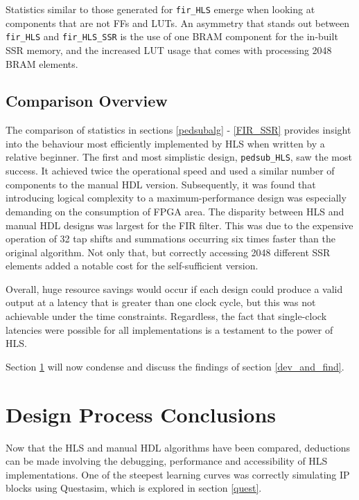 \documentclass[10pt]{article}
\begin{document}
Statistics similar to those generated for \texttt{fir\_HLS} emerge when looking at components that are not FFs and LUTs. An asymmetry that stands out between \texttt{fir\_HLS} and \texttt{fir\_HLS\_SSR} is the use of one BRAM component for the in-built SSR memory, and the increased LUT usage that comes with processing 2048 BRAM elements.

\subsection{Comparison Overview} \label{comp_overview}

The comparison of statistics in sections \ref{pedsubalg} - \ref{FIR_SSR} provides insight into the behaviour most efficiently implemented by HLS when written by a relative beginner. The first and most simplistic design, \texttt{pedsub\_HLS}, saw the most success. It achieved twice the operational speed and used a similar number of components to the manual HDL version. Subsequently, it was found that introducing logical complexity to a maximum-performance design was especially demanding on the consumption of FPGA area. The disparity between HLS and manual HDL designs was largest for the FIR filter. This was due to the expensive operation of 32 tap shifts and summations occurring six times faster than the original algorithm. Not only that, but correctly accessing 2048 different SSR elements added a notable cost for the self-sufficient version.

Overall, huge resource savings would occur if each design could produce a valid output at a latency that is greater than one clock cycle, but this was not achievable under the time constraints. Regardless, the fact that single-clock latencies were possible for all implementations is a testament to the power of HLS.

Section \ref{DPC} will now condense and discuss the findings of section \ref{dev_and_find}.

\section{Design Process Conclusions} \label{DPC}

Now that the HLS and manual HDL algorithms have been compared, deductions can be made involving the debugging, performance and accessibility of HLS implementations. One of the steepest learning curves was correctly simulating IP blocks using Questasim, which is explored in section \ref{quest}.
\end{document}
